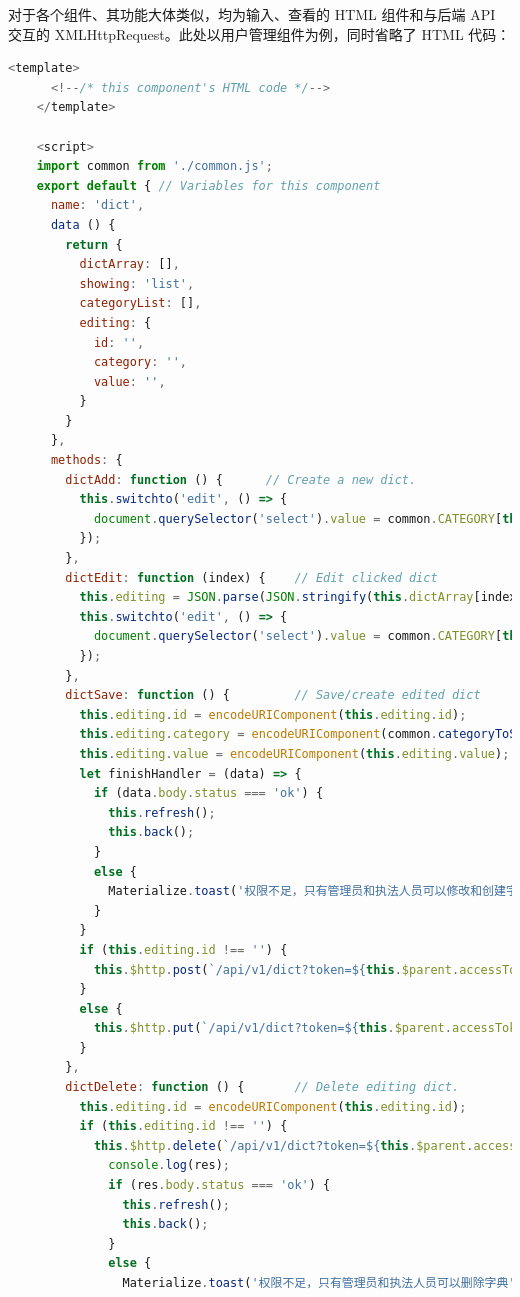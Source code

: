 \documentclass[a4paper, 12pt]{article}
\begin{document}
	对于各个组件、其功能大体类似，均为输入、查看的 HTML 组件和与后端 API 交互的 XMLHttpRequest。此处以用户管理组件为例，同时省略了 HTML 代码：
	\begin{lstlisting}[language=javascript, basicstyle=\small\lstfont, showstringspaces=false]
	<template>
	  <!--/* this component's HTML code */-->
	</template>
	
	<script>
	import common from './common.js';
	export default { // Variables for this component
	  name: 'dict',
	  data () {
	    return {
	      dictArray: [],
	      showing: 'list',
	      categoryList: [],
	      editing: {
	        id: '',
	        category: '',
	        value: '',
	      }
	    }
	  },
	  methods: {
	    dictAdd: function () { 		// Create a new dict.
	      this.switchto('edit', () => {
	        document.querySelector('select').value = common.CATEGORY[this.editing.category];
	      });
	    },
	    dictEdit: function (index) { 	// Edit clicked dict
	      this.editing = JSON.parse(JSON.stringify(this.dictArray[index]));
	      this.switchto('edit', () => {
	        document.querySelector('select').value = common.CATEGORY[this.editing.category];
	      });
	    },
	    dictSave: function () { 		// Save/create edited dict
	      this.editing.id = encodeURIComponent(this.editing.id);
	      this.editing.category = encodeURIComponent(common.categoryToString(document.querySelector('select').value));
	      this.editing.value = encodeURIComponent(this.editing.value);
	      let finishHandler = (data) => {
	        if (data.body.status === 'ok') {
	          this.refresh();
	          this.back();
	        }
	        else {
	          Materialize.toast('权限不足，只有管理员和执法人员可以修改和创建字典', 4000)
	        }
	      }
	      if (this.editing.id !== '') {
	        this.$http.post(`/api/v1/dict?token=${this.$parent.accessToken}&id=${this.editing.id}&category=${this.editing.category}&value=${this.editing.value}`).then(finishHandler)
	      }
	      else {
	        this.$http.put(`/api/v1/dict?token=${this.$parent.accessToken}&category=${this.editing.category}&value=${this.editing.value}`).then(finishHandler);
	      }
	    },
	    dictDelete: function () { 		// Delete editing dict.
	      this.editing.id = encodeURIComponent(this.editing.id);
	      if (this.editing.id !== '') {
	        this.$http.delete(`/api/v1/dict?token=${this.$parent.accessToken}&id=${this.editing.id}`).then((res) => {
	          console.log(res);
	          if (res.body.status === 'ok') {
	            this.refresh();
	            this.back();
	          }
	          else {
	            Materialize.toast('权限不足，只有管理员和执法人员可以删除字典', 4000)

\end{lstlisting}
\end{document}

